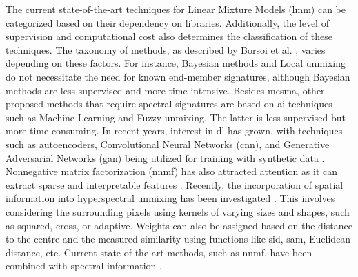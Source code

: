 The current state-of-the-art techniques for Linear Mixture Models (\acrshort{lmm}) can be categorized based on their dependency on libraries. Additionally, the level of supervision and computational cost also determines the classification of these techniques. The taxonomy of methods, as described by Borsoi et al. \cite{borsoi_spectral_2021}, varies depending on these factors. For instance, Bayesian methods and Local unmixing do not necessitate the need for known end-member signatures, although Bayesian methods are less supervised and more time-intensive. Besides \acrshort{mesma}, other proposed methods that require spectral signatures are based on \acrshort{ai} techniques such as Machine Learning and Fuzzy unmixing. The latter is less supervised but more time-consuming. In recent years, interest in \acrshort{dl} has grown, with techniques such as autoencoders, Convolutional Neural Networks (\acrshort{cnn}), and Generative Adversarial Networks (\acrshort{gan}) being utilized for training with synthetic data \cite{bhatt_deep_2020}. Nonnegative matrix factorization (\acrshort{nnmf}) has also attracted attention as it can extract sparse and interpretable features \cite{hruska_machine_2018}. Recently, the incorporation of spatial information into hyperspectral unmixing has been investigated \cite{shi_incorporating_2014}. This involves considering the surrounding pixels using kernels of varying sizes and shapes, such as squared, cross, or adaptive. Weights can also be assigned based on the distance to the centre and the measured similarity using functions like \acrshort{sid}, \acrshort{sam}, Euclidean distance, etc. Current state-of-the-art methods, such as \acrshort{nnmf}, have been combined with spectral information \cite{zhang_spectral-spatial_2022}.

